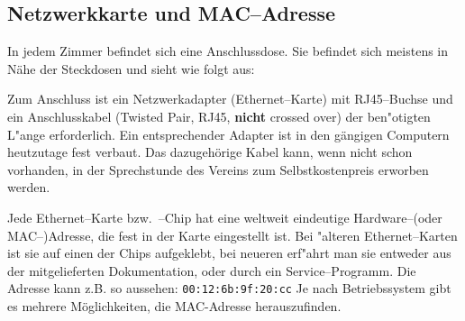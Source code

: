 
\subsection{Netzwerkkarte und MAC--Adresse}
In jedem Zimmer befindet sich eine Anschlussdose. Sie befindet sich
meistens in Nähe der Steckdosen und sieht wie folgt aus:


\rm Zum Anschluss ist ein Netzwerkadapter (Ethernet--Karte) mit RJ45--Buch\-se und
ein Anschlusskabel (Twisted Pair, RJ45, \textbf{nicht} crossed over) der
ben"otigten L"ange erforderlich. Ein entsprechender Adapter ist in den
gängigen Computern heutzutage fest verbaut. Das dazugehörige Kabel
kann, wenn nicht schon vorhanden, in der Sprechstunde des Vereins zum
Selbstkostenpreis erworben werden.

Jede Ethernet--Karte bzw.\ --Chip hat eine weltweit eindeutige Hardware--(oder
\glossar MAC--)Adresse, die fest in der Karte eingestellt ist. Bei "alteren
Ethernet--Karten ist sie auf einen der Chips aufgeklebt, bei neueren
erf"ahrt man sie entweder aus der mitgelieferten Dokumentation, oder
durch ein Service--Programm.%
Die Adresse kann z.B. so aussehen: \texttt{00:12:6b:9f:20:cc}
Je nach Betriebssystem gibt es mehrere Möglichkeiten, die MAC-Adresse
herauszufinden.


